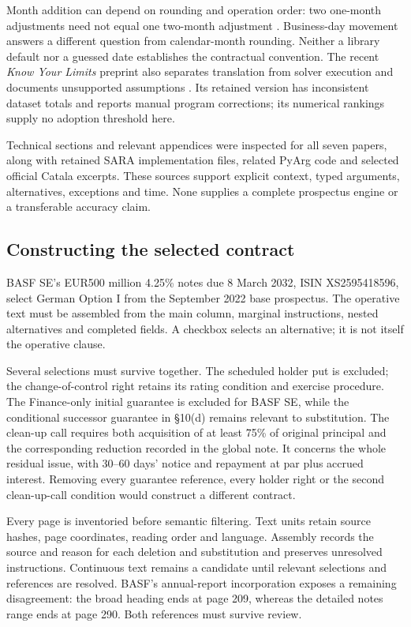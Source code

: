 Month addition can depend on rounding and operation order: two one-month
adjustments need not equal one two-month adjustment
\cite[Sections 2, 3.2 and 4.3]{dates2024}. Business-day movement answers a
different question from calendar-month rounding. Neither a library default
nor a guessed date establishes the contractual convention.
The recent \emph{Know Your Limits} preprint also separates translation from
solver execution and documents unsupported assumptions
\cite[Sections 3--5 and Appendix A]{limits2026}. Its retained version has
inconsistent dataset totals and reports manual program corrections; its
numerical rankings supply no adoption threshold here.

Technical sections and relevant appendices were inspected for all seven papers,
along with retained SARA implementation files, related PyArg code and selected
official Catala excerpts. These sources support explicit context, typed
arguments, alternatives, exceptions and time. None supplies a complete
prospectus engine or a transferable accuracy claim.

\subsection{Constructing the selected contract}

BASF SE's EUR500 million 4.25\% notes due 8 March 2032,
ISIN XS2595418596, select German Option I from the September 2022 base
prospectus. The operative text must be assembled from the main column, marginal
instructions, nested alternatives and completed fields. A checkbox selects an
alternative; it is not itself the operative clause.

Several selections must survive together. The scheduled holder put is excluded;
the change-of-control right retains its rating condition and exercise procedure.
The Finance-only initial guarantee is excluded for BASF SE, while the conditional
successor guarantee in \S10(d) remains relevant to substitution. The clean-up call
requires both acquisition of at least 75\% of original principal and the
corresponding reduction recorded in the global note. It concerns the whole
residual issue, with 30--60 days' notice and repayment at par plus accrued
interest. Removing every guarantee reference, every holder right or the second
clean-up-call condition would construct a different contract.

Every page is inventoried before semantic filtering. Text units retain source
hashes, page coordinates, reading order and language. Assembly records the source
and reason for each deletion and substitution and preserves unresolved
instructions. Continuous text remains a candidate until relevant selections and
references are resolved. BASF's annual-report incorporation exposes a remaining
disagreement: the broad heading ends at page 209, whereas the detailed notes
range ends at page 290. Both references must survive review.

